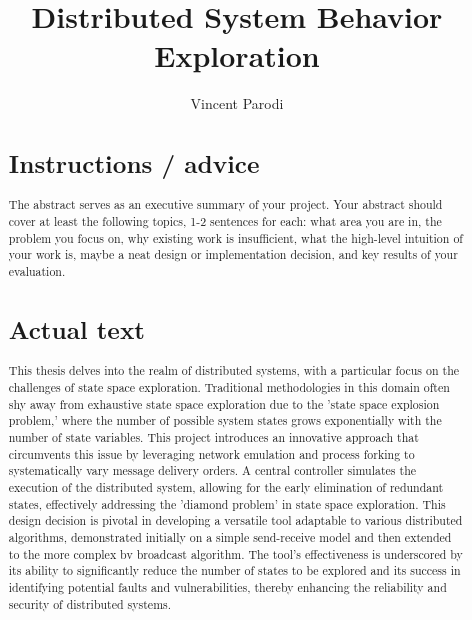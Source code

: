 \documentclass[a4paper,11pt,oneside]{report}
\title{Distributed System Behavior Exploration}
\author{Vincent Parodi}
\begin{document}
\maketitle
\makededication
\makeacks

\begin{abstract}

\section{Instructions / advice}
The abstract serves as an executive summary of your project.
Your abstract should cover at least the following topics, 1-2 sentences for
each: what area you are in, the problem you focus on, why existing work is
insufficient, what the high-level intuition of your work is, maybe a neat
design or implementation decision, and key results of your evaluation.

\section{Actual text}
This thesis delves into the realm of distributed systems, with a particular focus on the challenges of state space exploration. Traditional methodologies in this domain often shy away from exhaustive state space exploration due to the 'state space explosion problem,' where the number of possible system states grows exponentially with the number of state variables. This project introduces an innovative approach that circumvents this issue by leveraging network emulation and process forking to systematically vary message delivery orders. A central controller simulates the execution of the distributed system, allowing for the early elimination of redundant states, effectively addressing the 'diamond problem' in state space exploration. This design decision is pivotal in developing a versatile tool adaptable to various distributed algorithms, demonstrated initially on a simple send-receive model and then extended to the more complex bv broadcast algorithm. The tool's effectiveness is underscored by its ability to significantly reduce the number of states to be explored and its success in identifying potential faults and vulnerabilities, thereby enhancing the reliability and security of distributed systems.


\end{abstract}
\end{document}
